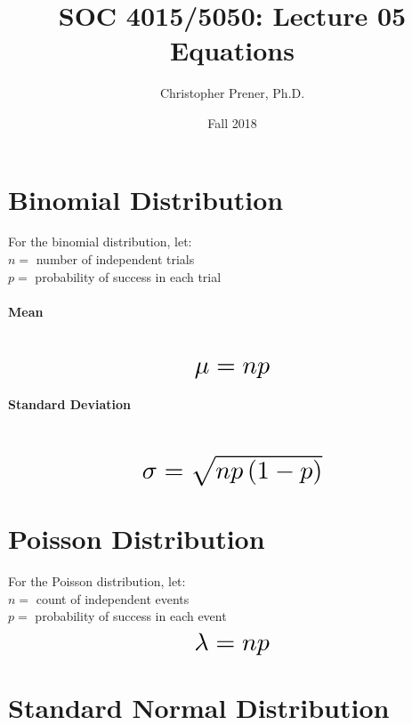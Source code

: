 \documentclass{tufte-handout}
\title{SOC 4015/5050: Lecture 05 Equations}
\author{Christopher Prener, Ph.D.}
\date{Fall 2018}
\begin{document}
\maketitle %

\vspace{5mm}
\section{Binomial Distribution}
For the binomial distribution, let: \\
\noindent $n =$ number of independent trials \\
\noindent $p =$ probability of success in each trial

\paragraph{Mean}\mbox{}\\
\begin{equation}
\scalebox{2} {$ \mu = np $}
\end{equation}

\paragraph{Standard Deviation}\mbox{}\\
\begin{equation}
\scalebox{2} {$ \sigma =\sqrt { np\left( 1-p \right)  } $}
\end{equation}

\vspace{5mm}
\section{Poisson Distribution}
For the Poisson distribution, let: \\
\noindent $n =$ count of independent events \\
\noindent $p =$ probability of success in each event \\
\begin{equation}
\scalebox{2} {$ \lambda = np $}
\end{equation}

\vspace{5mm}
\section{Standard Normal Distribution}
\end{document}
